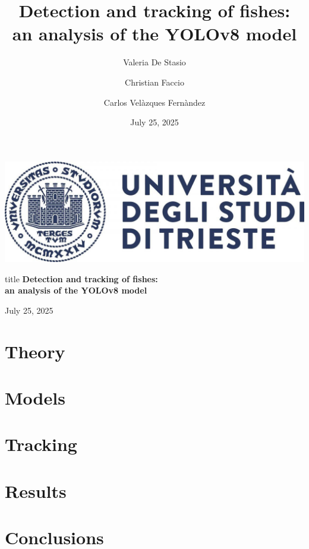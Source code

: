 \documentclass[serif]{beamer}  %
\author{
    Valeria De Stasio \\ 
    \and  
    Christian Faccio \\
    \and  
    Carlos Velàzques Fernàndez
}
\title{Detection and tracking of fishes: \\ an analysis of the YOLOv8 model}
\date{\small July 25, 2025}
\begin{document}
\begin{frame}
    \vfill
    \begin{center}
        \includegraphics[keepaspectratio, scale=0.15]{images/logo.jpg}
        
        \vspace{1cm}
        
        \begin{beamercolorbox}[wd=\textwidth,center,rounded=true]{title}
            {\Large\textbf{Detection and tracking of fishes: \\ an analysis of the YOLOv8 model}}
        \end{beamercolorbox}
        
        \vspace{1cm}
        
        {July 25, 2025}
    \end{center}
    \vfill
\end{frame}

\begin{frame}    
\tableofcontents[sectionstyle=show,
subsectionstyle=show/shaded/hide,
subsubsectionstyle=show/shaded/hide]
\end{frame}

\section{Theory}

\section{Models}

\section{Tracking}

\section{Results}

\section{Conclusions}
\end{document}
